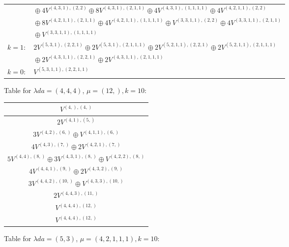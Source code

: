 \documentclass[a4paper,12pt]{article}
\begin{document}
\begin{table}[H]
\begin{tabular}{|p{15.5cm}|}
$\phantom{k = 2: \quad} \oplus 4 V^{(4, 3, 1), (2, 2)} \oplus 8 V^{(4, 3, 1), (2, 1, 1)} \oplus 4 V^{(4, 3, 1), (1, 1, 1, 1)} \oplus 4 V^{(4, 2, 1, 1), (2, 2)} $ \\
$\phantom{k = 2: \quad} \oplus 8 V^{(4, 2, 1, 1), (2, 1, 1)} \oplus 4 V^{(4, 2, 1, 1), (1, 1, 1, 1)} \oplus V^{(3, 3, 1, 1), (2, 2)} \oplus 4 V^{(3, 3, 1, 1), (2, 1, 1)} $ \\
$\phantom{k = 2: \quad} \oplus V^{(3, 3, 1, 1), (1, 1, 1, 1)} $ \\ \hline
$k = 1: \quad 2 V^{(5, 3, 1), (2, 2, 1)} \oplus 2 V^{(5, 3, 1), (2, 1, 1, 1)} \oplus 2 V^{(5, 2, 1, 1), (2, 2, 1)} \oplus 2 V^{(5, 2, 1, 1), (2, 1, 1, 1)} $ \\
$\phantom{k = 1: \quad} \oplus 2 V^{(4, 3, 1, 1), (2, 2, 1)} \oplus 2 V^{(4, 3, 1, 1), (2, 1, 1, 1)} $ \\ \hline
$k = 0: \quad V^{(5, 3, 1, 1), (2, 2, 1, 1)} $ \\ \hline
\end{tabular}
\end{table}

Table for $\lambda da = (4, 4, 4)$, $\mu = (12,), k = 10$:

\begin{table}[h]
\centering
\begin{tabular}{|c|}
\hline
$V^{(4,), (4,)} $ \\ \hline
$2 V^{(4, 1), (5,)} $ \\ \hline
$3 V^{(4, 2), (6,)} \oplus V^{(4, 1, 1), (6,)} $ \\ \hline
$4 V^{(4, 3), (7,)} \oplus 2 V^{(4, 2, 1), (7,)} $ \\ \hline
$5 V^{(4, 4), (8,)} \oplus 3 V^{(4, 3, 1), (8,)} \oplus V^{(4, 2, 2), (8,)} $ \\ \hline
$4 V^{(4, 4, 1), (9,)} \oplus 2 V^{(4, 3, 2), (9,)} $ \\ \hline
$3 V^{(4, 4, 2), (10,)} \oplus V^{(4, 3, 3), (10,)} $ \\ \hline
$2 V^{(4, 4, 3), (11,)} $ \\ \hline
$V^{(4, 4, 4), (12,)} $ \\ \hline
 $V^{(4, 4, 4), (12,)}$\\ \hline
\end{tabular}
\end{table}

Table for $\lambda da = (5, 3)$, $\mu = (4, 2, 1, 1, 1), k = 10$:
\end{document}
